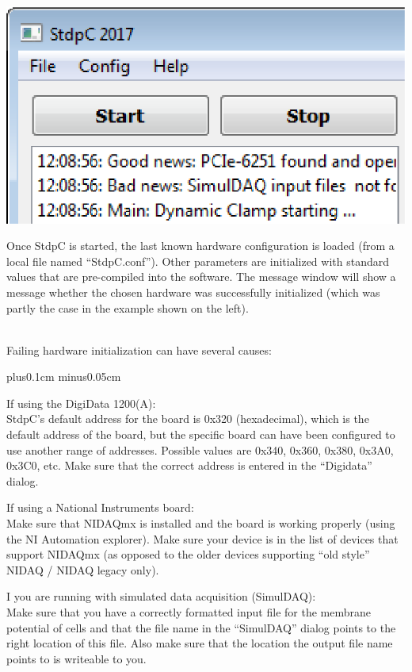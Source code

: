 \documentclass{article}
\makeatletter
\newenvironment{myenum}{
\begin{list}{\labelenumi}{\setlength{\leftmargin}{1.3em}
  \setcounter{enumi}{0}
  \renewcommand{\item}{\addtocounter{enumi}{1}\unskip \vspace{-0.1cm}\@inmatherr\item
  \@ifnextchar [\@item{\@noitemargtrue \@item[\@itemlabel]} \unskip}}
  \itemsep0.1cm plus0.1cm minus0.05cm
  \listparindent0cm
  \setlength{\labelsep}{0.5em}
  \setlength{\labelwidth}{0.8em}}
{\end{list}}
\makeatother
\begin{document}
\parbox[b]{0.35\textwidth}{
\includegraphics[scale=0.5]{mainBlock}
} \hfill
\parbox[b]{0.64\textwidth}{ Once StdpC is started, the last known hardware
  configuration is loaded (from a local file named
  ``StdpC.conf''). Other parameters are initialized with standard
  values that are pre-compiled into the software. The message window
  will show a message whether the chosen hardware was successfully
  initialized (which was partly the case in the example shown on the left).
} \\
Failing hardware initialization can have several causes: \\[-0.2cm]
\begin{myenum}
\item If using the DigiData 1200(A): \\
StdpC's default address for the board is 0x320 (hexadecimal), which
is the default address of the board, but the specific board can have been
configured to use another range of addresses. Possible values are 0x340,
0x360, 0x380, 0x3A0, 0x3C0, etc. Make sure that the correct address is
entered in the ``Digidata'' dialog.
\item If using a National Instruments board: \\
Make sure that NIDAQmx is installed and the board is working properly
(using the NI Automation explorer). Make sure your device is in the
list of devices that support NIDAQmx (as opposed to the older devices
supporting ``old style'' NIDAQ / NIDAQ legacy only).
\item I you are running with simulated data acquisition (SimulDAQ): \\
Make sure that you have a correctly formatted input file for the
membrane potential of cells and that the file name in the ``SimulDAQ''
dialog points to the right location of this file. Also make sure that the
location the output file name points to is writeable to you.
\end{myenum}
\end{document}
